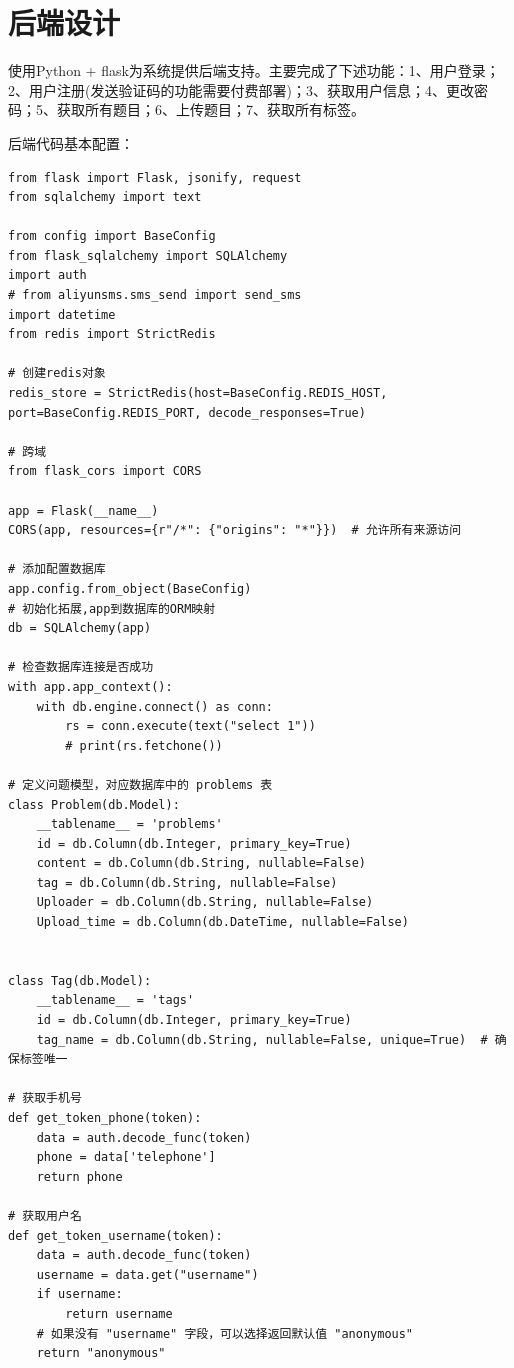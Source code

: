 \documentclass[a4paper,AutoFakeBold={2.7}]{ctexart} %
\begin{document}
\section{后端设计}

使用Python + flask为系统提供后端支持。主要完成了下述功能：1、用户登录；2、用户注册(发送验证码的功能需要付费部署)；3、获取用户信息；4、更改密码；5、获取所有题目；6、上传题目；7、获取所有标签。

后端代码基本配置：

\begin{lstlisting}
from flask import Flask, jsonify, request
from sqlalchemy import text

from config import BaseConfig
from flask_sqlalchemy import SQLAlchemy
import auth
# from aliyunsms.sms_send import send_sms
import datetime
from redis import StrictRedis

# 创建redis对象
redis_store = StrictRedis(host=BaseConfig.REDIS_HOST, port=BaseConfig.REDIS_PORT, decode_responses=True)

# 跨域
from flask_cors import CORS

app = Flask(__name__)
CORS(app, resources={r"/*": {"origins": "*"}})  # 允许所有来源访问

# 添加配置数据库
app.config.from_object(BaseConfig)
# 初始化拓展,app到数据库的ORM映射
db = SQLAlchemy(app)

# 检查数据库连接是否成功
with app.app_context():
    with db.engine.connect() as conn:
        rs = conn.execute(text("select 1"))
        # print(rs.fetchone())

# 定义问题模型，对应数据库中的 problems 表
class Problem(db.Model):
    __tablename__ = 'problems'
    id = db.Column(db.Integer, primary_key=True)
    content = db.Column(db.String, nullable=False)
    tag = db.Column(db.String, nullable=False)
    Uploader = db.Column(db.String, nullable=False)
    Upload_time = db.Column(db.DateTime, nullable=False)


class Tag(db.Model):
    __tablename__ = 'tags'
    id = db.Column(db.Integer, primary_key=True)
    tag_name = db.Column(db.String, nullable=False, unique=True)  # 确保标签唯一

# 获取手机号
def get_token_phone(token):
    data = auth.decode_func(token)
    phone = data['telephone']
    return phone

# 获取用户名
def get_token_username(token):
    data = auth.decode_func(token)
    username = data.get("username")
    if username:
        return username
    # 如果没有 "username" 字段，可以选择返回默认值 "anonymous"
    return "anonymous"
\end{lstlisting}
\end{document}
